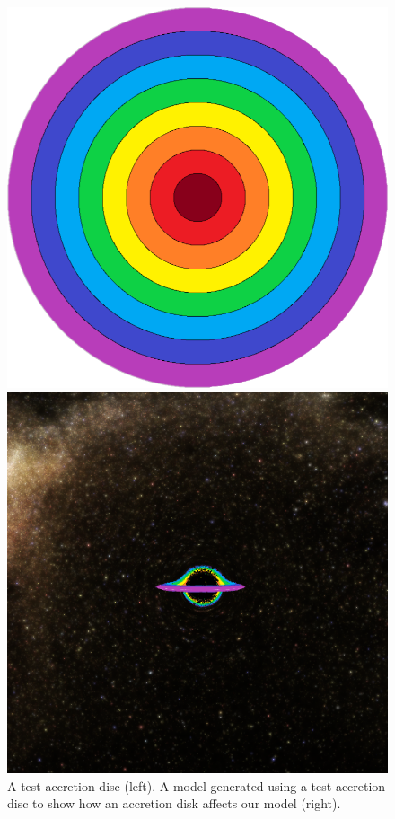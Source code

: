 \documentclass[oneside,openright,frontopenright, singlespacing]{dmathesis}
\begin{document}
\begin{figure}[!ht]
	\centering
	\begin{minipage}{0.5\textwidth}
		\centering
		\includegraphics[width=0.9\linewidth]{img/test-accretion}
	\end{minipage}%
	\hfill
	\begin{minipage}{0.5\textwidth}
		\centering
		\includegraphics[width=0.9\linewidth]{img/milky-way-hdri-accretion(1)}
	\end{minipage}
	\caption{A test accretion disc (left). A model generated using a test accretion disc to show how an accretion disk affects our model (right).}
	\label{fig:Figure5.1}
\end{figure}
\end{document}
